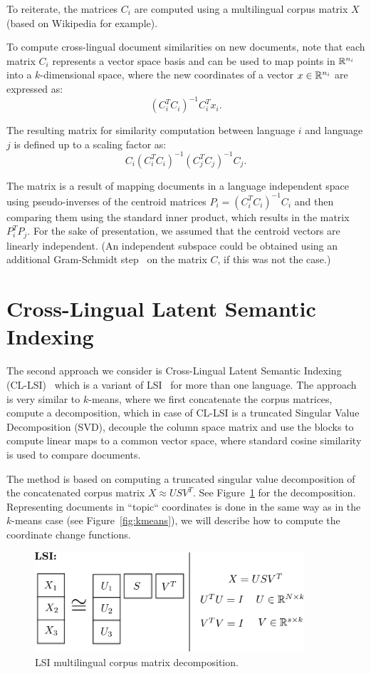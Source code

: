 To reiterate, the matrices $C_i$ are computed using a multilingual corpus 
matrix $X$ (based on Wikipedia for example).

To compute  cross-lingual document similarities on new documents, note that each matrix $C_i$ represents 
a vector space basis and can be used to map points in $\mathbb{R}^{n_i}$ into a $k$-dimensional space, where 
the new coordinates of a vector $x \in \mathbb{R}^{n_i}$ are expressed as: $$(C_i^T C_i)^{-1} C_i^T x_i.$$

The resulting matrix for similarity computation between language $i$ and language $j$ 
is defined up to a scaling factor as:
$$C_i(C_i^T C_i)^{-1} (C_j^T C_j)^{-1} C_j.$$

The matrix is a result of mapping documents in a language independent space using 
pseudo-inverses of the centroid matrices $P_i = (C_i^T C_i)^{-1} C_i$ and then 
comparing them using the standard inner product, which results in the matrix 
$P_i^T P_j$. For the sake of presentation, we assumed that the centroid vectors 
are linearly independent. (An independent subspace could be obtained using an 
additional Gram-Schmidt step~\cite{golub} on the matrix $C$, if this was not the case.)

\section{Cross-Lingual Latent Semantic Indexing}\label{sec:LSI}

The second approach we consider is Cross-Lingual Latent Semantic Indexing 
(CL-LSI)~\cite{cl_lsi} which is a variant of LSI~\cite{lsi} for more than one language. 
The approach is very similar to $k$-means, where we first concatenate the corpus matrices, 
compute a decomposition, which in case of CL-LSI is a truncated Singular Value 
Decomposition (SVD), decouple the column space matrix and use the blocks to compute 
linear maps to a common vector space, where standard cosine similarity is used to 
compare documents.

The method is based on computing a truncated singular value decomposition of the concatenated 
corpus matrix $X \approx U S V^T$. See Figure~\ref{fig:lsi} for the decomposition. Representing 
documents in ``topic`` coordinates is done in the same way as in the $k$-means case 
(see Figure~\ref{fig:kmeans}), we will describe how to compute the coordinate change functions.

\begin{figure}[tbp]
\centering
\includegraphics[width=10cm]{figures/lsi.pdf}
\caption{\label{fig:lsi} LSI multilingual corpus matrix decomposition.}
\end{figure}

